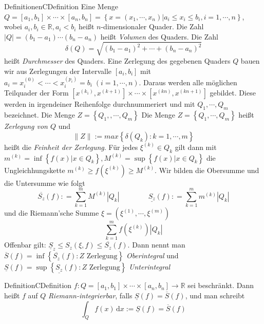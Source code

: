 %
%
\begin{ibox}[]{Definitionen}{CDefinition}
	Eine Menge $ Q = [a_1,b_1] \times \cdots \times [a_n, b_n] = \left\{ x = \left( x_1 , \cdots,  x_n \right) 
	| a_i \leq x_i \leq b_i, i = 1 , \cdots,  n \right\}  $, wobei $ a_i, b_i \in \mathbb{R}, a_i < b_i $ heißt $ n $-dimensionaler 
	Quader. Die Zahl $ | Q | = (b_1-a_1) \cdots (b_n-a_n) $ heißt \textit{Volumen} des Quaders. Die Zahl 
	$$ \delta (Q) = \sqrt{(b_1-a_1)^{2} + \cdots + (b_n-a_n)^{2} } $$
	heißt \textit{Durchmesser} des Quaders. Eine Zerlegung des gegebenen Quaders $ Q $ bauen wir aus Zerlegungen der Intervalle $ [a_i,b_i] $ 
	mit $ a_i = x_i^{(0)} < \cdots < x_i^{(p_i)} = b_i \; \left(  i = 1 , \cdots,  n \right)$. Daraus werden alle möglichen Teilquader der 
	Form $ \left[ x^{(k_1)}, x^{(k+1) } \right] \times \cdots \times \left[ x^{(kn) }, x^{(kn+1) } \right]  $ gebildet. Diese werden in 
	irgendeiner Reihenfolge durchnummeriert und mit $ Q_1 ,\cdots , Q_{m} $ bezeichnet. Die Menge $ Z = \left\{ Q_1, , \cdots,  Q_{m} \right\}$ 
	Die Menge $ Z = \left\{ Q_1 , \cdots,  Q_{m} \right\}  $ heißt \textit{Zerlegung von $ Q $ } und
	$$
	\|Z \| := max \left\{ \delta (Q_k) : k = 1 , \cdots,  m \right\} 
	$$ heißt die \textit{Feinheit der Zerlegung}. Für jedes $ \xi^{(k) } \in Q_k $ gilt dann mit $ m^{(k) } = \inf \left\{ f (x) | x \in Q_k \right\} , M^{(k) } = \sup \left\{ 
	f (x) | x \in Q_k \right\}  $ die Ungleichhungskette $ m^{(k) } \geq f (\xi^{(k)}) \geq M ^{(k) } $. Wir bilden die Obersumme und die Untersumme wie folgt
	$$
	\overline{S_{z}} (f) : = \sum_{k=1}^{m}  M ^{(k)} \left| Q_k \right| \qquad \qquad 
	\underline{S_{z}} (f) : = \sum_{k=1}^{m}  m ^{(k)} \left| Q_k \right| 
	$$ und die Riemann'sche Summe $ \xi = \left( \xi^{(1) } , \cdots,  \xi^{(m)} \right)  $ 
	$$
 \sum_{k=1}^{m} f \left( \xi ^{(k)} \right) \left| Q_k \right| 
$$
Offenbar gilt: $ \underline{S}_z \leq S_z (\xi,f) \leq \overline{S_{z}} (f)  $. Dann nennt man $ \overline{S} (f) = \inf \left\{ \overline{S_{z}}
(f)  : Z \text{ Zerlegung}\right\}  $ \textit{Oberintegral} und $ \underline{S} (f) = \sup \left\{ \underline{S_{z}}
(f)  : Z \text{ Zerlegung}\right\}  $ \textit{Unterintegral} 	
\end{ibox}

\begin{ibox}[]{Definition}{CDefinition}
	$ f : Q = [a_1,b_1] \times \cdots \times [a_n,b_n] \to \mathbb{R}$ sei beschränkt. Dann heißt $ f $ auf $ Q $ \textit{Riemann-integrierbar}, falls
$ \underline{S} (f) = \overline{S} (f)$, und man schreibt 
$$ \int_{ Q } f (x) \, \mathrm{d}x := \underline{S} (f) = \overline{S} (f) $$
\end{ibox}

